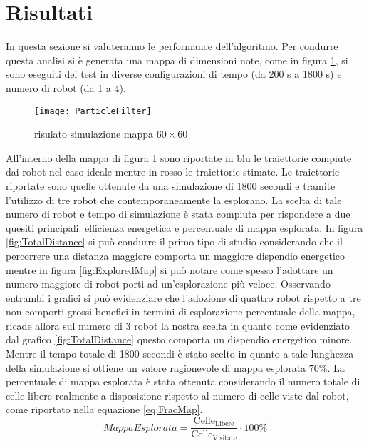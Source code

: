 \section{Risultati}
\label{sec:risultati}
In questa sezione si valuteranno le performance dell'algoritmo.
Per condurre questa analisi si è generata una mappa di dimensioni note, come  in
figura \ref{fig:maptest}, si sono eseguiti dei test in diverse configurazioni
di tempo (da 200 \si{\second} a 1800 \si{\second}) e numero di robot
(da 1 a 4).
\begin{figure}[!htb]
	\centering
	\texttt{[image: ParticleFilter]}
	\caption{risulato simulazione mappa $60\times60$}
	\label{fig:maptest}
\end{figure}
All'interno della mappa di figura \ref{fig:maptest} sono riportate in blu le
traiettorie compiute dai robot nel caso ideale mentre in rosso le traiettorie stimate.
Le traiettorie riportate sono quelle ottenute da una simulazione di 1800
secondi e tramite l'utilizzo di tre robot che contemporaneamente la esplorano.
La scelta di tale numero di robot e tempo di simulazione è stata compiuta per
rispondere a due quesiti principali: efficienza energetica e percentuale di
mappa esplorata.
In figura \ref{fig:TotalDistance} si può condurre il primo tipo di studio
considerando che il percorrere una distanza maggiore comporta un maggiore
dispendio energetico mentre in figura \ref{fig:ExploredMap} si può notare come
spesso l'adottare un numero maggiore di robot porti ad un'esplorazione più
veloce.
Osservando entrambi i grafici si può evidenziare che l'adozione di quattro robot
rispetto a tre non comporti grossi benefici in termini di esplorazione
percentuale della mappa, ricade allora sul numero di 3 robot la nostra scelta in
quanto come evidenziato dal grafico \ref{fig:TotalDistance} questo comporta un
dispendio energetico minore.
Mentre il tempo totale di 1800 secondi è stato scelto in quanto a tale lunghezza
della  simulazione si ottiene un valore ragionevole di mappa esplorata $70\%$.
La percentuale di mappa esplorata è stata ottenuta considerando il numero totale
di celle libere realmente a disposizione rispetto al numero di celle viste dal
robot, come riportato nella equazione \eqref{eq:FracMap}.
%
\begin{equation}
Mappa Esplorata = \frac{\text{Celle}_{\text{Libere}}}{\text{Celle}_{\text{Visitate}}} \cdot 100 \%
\label{eq:FracMap}
\end{equation}

